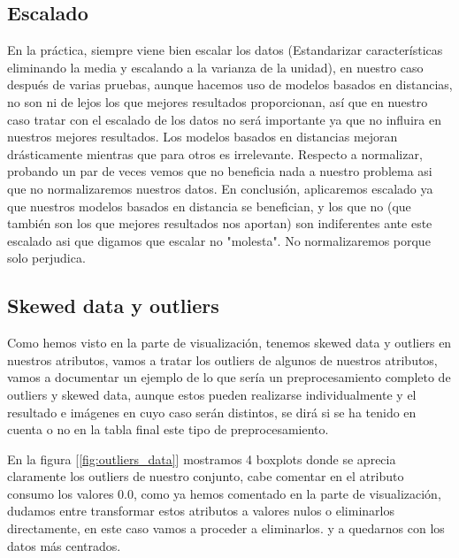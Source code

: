 \documentclass[12pt,twoside]{report}
\begin{document}
\subsection*{Escalado}
En la práctica, siempre viene bien escalar los datos (Estandarizar características eliminando la media y escalando a la varianza de la unidad), en nuestro caso después de varias pruebas, aunque hacemos uso de modelos basados en distancias, no son ni de lejos los que mejores resultados proporcionan, así que en nuestro caso tratar con el escalado de los datos no será importante ya que no influira en nuestros mejores resultados. Los modelos basados en distancias mejoran drásticamente mientras que para otros es irrelevante. Respecto a normalizar, probando un par de veces vemos que no beneficia nada a nuestro problema asi que no normalizaremos nuestros datos. En conclusión, aplicaremos escalado ya que nuestros modelos basados en distancia se benefician, y los que no (que también son los que mejores resultados nos aportan) son indiferentes ante este escalado asi que digamos que escalar no "molesta". No normalizaremos porque solo perjudica.

\subsection*{Skewed data y outliers}

Como hemos visto en la parte de visualización, tenemos skewed data y outliers en nuestros atributos, vamos a tratar los outliers de algunos de nuestros atributos, vamos a documentar un ejemplo de lo que sería un preprocesamiento completo de outliers y skewed data, aunque estos pueden realizarse individualmente y el resultado e imágenes en cuyo caso serán distintos, se dirá si se ha tenido en cuenta o no en la tabla final este tipo de preprocesamiento.

En la figura [\ref{fig:outliers_data}] mostramos 4 boxplots donde se aprecia claramente los outliers de nuestro conjunto, cabe comentar en el atributo consumo los valores 0.0, como ya hemos comentado en la parte de visualización, dudamos entre transformar estos atributos a valores nulos o eliminarlos directamente, en este caso vamos a proceder a eliminarlos. y a quedarnos con los datos más centrados.
\end{document}
